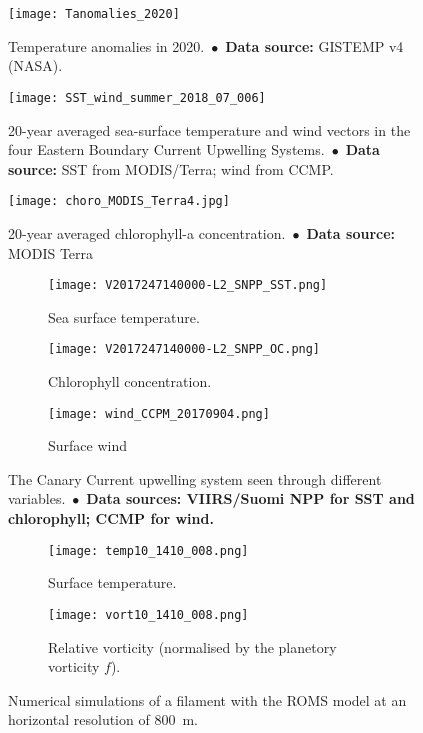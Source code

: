 \documentclass[final,table,svgnames]{article}
\begin{document}
\pagestyle{empty}

\begin{figure}
\centering
\texttt{[image: Tanomalies\_2020]}
\caption{Temperature anomalies in 2020.~$\bullet$~\textbf{Data source:} GISTEMP v4 (NASA).}
\end{figure}


\begin{figure}
\centering
\texttt{[image: SST\_wind\_summer\_2018\_07\_006]}
\caption{20-year averaged sea-surface temperature and wind vectors in the four Eastern Boundary Current Upwelling Systems.~$\bullet$~\textbf{Data source:} SST from MODIS/Terra; wind from CCMP.}
\end{figure}




\begin{figure}
\centering
\texttt{[image: choro\_MODIS\_Terra4.jpg]}
\caption{20-year averaged chlorophyll-a concentration.~$\bullet$~\textbf{Data source:} MODIS Terra}
\end{figure}


\begin{figure}
\centering

\begin{subfigure}[t]{0.33\textwidth}
\centering
\texttt{[image: V2017247140000-L2\_SNPP\_SST.png]}
\caption{Sea surface temperature.}
\end{subfigure}
\begin{subfigure}[t]{0.33\textwidth}
\centering
\texttt{[image: V2017247140000-L2\_SNPP\_OC.png]}
\caption{Chlorophyll concentration.}
\end{subfigure}
\begin{subfigure}[t]{0.33\textwidth}
\centering
\texttt{[image: wind\_CCPM\_20170904.png]}
\caption{Surface wind}
\end{subfigure}    
    
\caption{The Canary Current upwelling system seen through different variables.~$\bullet$~\textbf{Data sources: VIIRS/Suomi NPP for SST and chlorophyll; CCMP for wind.}}
\end{figure}



\begin{figure}
\centering

\begin{subfigure}[t]{0.495\textwidth}
\centering
\texttt{[image: temp10\_1410\_008.png]}
\caption{Surface temperature.}
\end{subfigure}
\begin{subfigure}[t]{0.495\textwidth}
\centering
\texttt{[image: vort10\_1410\_008.png]}
\caption{Relative vorticity (normalised by the planetory vorticity $f$).}
\end{subfigure}     
     
\caption{Numerical simulations of a filament with the ROMS model at an horizontal resolution of 800~m.}
\end{figure}
\end{document}
